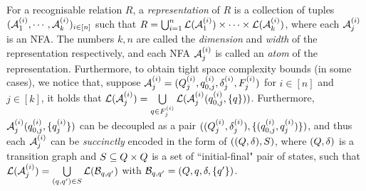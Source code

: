 For a recognisable relation $R$,  a \emph{representation} of $R$ is a collection of tuples $(\mathcal{A}^{(i)}_1, \cdots, \mathcal{A}^{(i)}_k)_{i\in [n]}$  such that 
$R = \bigcup_{i=1}^n \mathcal{L}(\mathcal{A}^{(i)}_1) \times \cdots\times \mathcal{L}(\mathcal{A}^{(i)}_k)$, where each $\mathcal{A}^{(i)}_j$ is an NFA. The numbers $k, n$ are called the \emph{dimension} and \emph{width}  of the representation respectively, and each NFA $\mathcal{A}^{(i)}_j$ is called an \emph{atom} of the representation.
Furthermore, to obtain tight space complexity bounds (in some cases), we notice that, 
suppose $\mathcal{A}^{(i)}_j=(Q^{(i)}_j, q^{(i)}_{0,j}, \delta^{(i)}_j, F^{(i)}_j)$ for $i \in [n]$ and $j \in [k]$, it holds that $\mathcal{L}(\mathcal{A}^{(i)}_j) = \bigcup \limits_{q \in F^{(i)}_j} \mathcal{L}(\mathcal{A}^{(i)}_j(q^{(i)}_{0,j}, \{q\}))$. Furthermore,  $\mathcal{A}^{(i)}_j(q^{(i)}_{0, j}, \{q^{(i)}_j\})$ can be decoupled as a pair $((Q^{(i)}_j,  \delta^{(i)}_j), \{(q^{(i)}_{0,j}, q^{(i)}_j)\})$, 
%
%
%
and thus each $\mathcal{A}^{(i)}_j$ can be \emph{succinctly} encoded in the form of $((Q, \delta), S)$, where $(Q, \delta)$ is a transition graph and $S \subseteq Q \times Q$ is a set of ``initial-final" pair of states, such that $\mathcal{L}(\mathcal{A}^{(i)}_j) = \bigcup \limits_{(q,q') \in S} \mathcal{L}(\mathcal{B}_{q,q'})$  with $\mathcal{B}_{q,q'} = (Q, q, \delta, \{q'\})$. 

